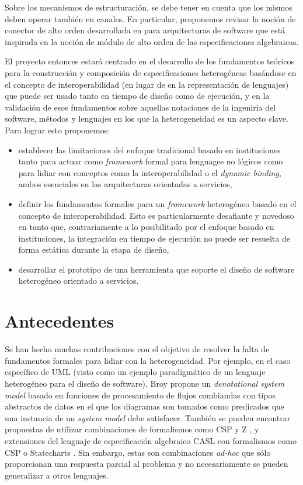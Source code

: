 \documentclass[a4paper, 11pt]{article}
\begin{document}
  Sobre los mecanismos de estructuración, se debe tener en cuenta que los mismos deben operar también en canales. En particular, proponemos revisar la noción de conector de alto orden desarrollada en \cite{lopez+:acmtosem-12_1} para arquitecturas de software que está inspirada en la noción de módulo de alto orden de las especificaciones algebraicas.
  
  El proyecto entonces estará centrado en el desarrollo de los fundamentos teóricos para la construcción y composición de especificaciones heterogéneas basándose en el concepto de interoperabilidad (en lugar de en la representación de lenguajes) que puede ser usado tanto en tiempo de diseño como de ejecución, y en la validación de esos fundamentos sobre aquellas notaciones de la ingeniría del software, métodos y lenguajes en los que la heterogeneidad es un aspecto clave. Para lograr esto proponemos:

  \begin{itemize}
  \item establecer las limitaciones del enfoque tradicional basado en instituciones tanto para actuar como \emph{framework} formal para lenguages no lógicos como para lidiar con conceptos como la interoperabilidad o el \emph{dynamic binding}, ambos esenciales en las arquitecturas orientadas a servicios,
  
  \item definir los fundamentos formales para un \emph{framework} heterogéneo basado en el concepto de interoperabilidad. Esto es particularmente desafiante y novedoso en tanto que, contrariamente a lo posibilitado por el enfoque basado en instituciones, la integración en tiempo de ejecución no puede ser resuelta de forma estática durante la etapa de diseño,
  
  \item desarrollar el prototipo de una herramienta que soporte el diseño de software heterogéneo orientado a servicios.
  \end{itemize}

\section{Antecedentes}

Se han hecho muchas contribuciones con el objetivo de resolver la falta de fundamentos formales para lidiar con la heterogeneidad. Por ejemplo, en el caso específico de UML (visto como un ejemplo paradigmático de un lenguaje heterogéneo para el diseño de software), Broy propone un \emph{denotational system model} basado en funciones de procesamiento de flujos combiandas con tipos abstractos de datos \cite{broy:TUM-I0612,broy:TUM-I0710,broy:TUM-I0711} en el que los diagramas son tomados como predicados que una instancia de un \emph{system model} debe satisfacer. También se pueden encontrar propuestas de utilizar combinaciones de formalismos como CSP y Z \cite{fischer+:fmoods97}, y extensiones del lenguaje de especificación algebraico CASL \cite{astesiano:tcs-286_44} con formalismos como CSP \cite{roggenbach:tcs-354_1} o Statecharts \cite{reggio:amast00}. Sin embargo, estas son combinaciones \emph{ad-hoc} que sólo proporcionan una respuesta parcial al problema y no necesariamente se pueden generalizar a otros lenguajes.
\end{document}
